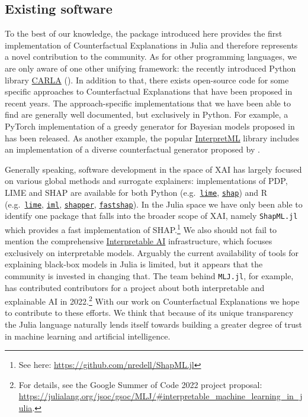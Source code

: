 \documentclass{juliacon}
\begin{document}
\hypertarget{existing-software}{%
\subsection{Existing software}\label{existing-software}}

To the best of our knowledge, the package introduced here provides the
first implementation of Counterfactual Explanations in Julia and
therefore represents a novel contribution to the community. As for other
programming languages, we are only aware of one other unifying
framework: the recently introduced Python library
\href{https://carla-counterfactual-and-recourse-library.readthedocs.io/en/latest/?badge=latest}{CARLA}
(\cite{pawelczyk2021carla}). In addition to that, there exists
open-source code for some specific approaches to Counterfactual
Explanations that have been proposed in recent years. The
approach-specific implementations that we have been able to find are
generally well documented, but exclusively in Python. For example, a
PyTorch implementation of a greedy generator for Bayesian models
proposed in \cite{schut2021generating} has been released. As another
example, the popular \href{https://github.com/interpretml}{InterpretML}
library includes an implementation of a diverse counterfactual generator
proposed by \cite{mothilal2020explaining}.

Generally speaking, software development in the space of XAI has largely
focused on various global methods and surrogate explainers:
implementations of PDP, LIME and SHAP are available for both Python
(e.g.~\href{https://github.com/marcotcr/lime}{\texttt{lime}},
\href{https://github.com/slundberg/shap}{\texttt{shap}}) and R
(e.g.~\href{https://cran.r-project.org/web/packages/lime/index.html}{\texttt{lime}},
\href{https://cran.r-project.org/web/packages/lime/index.html}{\texttt{iml}},
\href{https://modeloriented.github.io/shapper/}{\texttt{shapper}},
\href{https://github.com/bgreenwell/fastshap}{\texttt{fastshap}}). In
the Julia space we have only been able to identify one package that
falls into the broader scope of XAI, namely \texttt{ShapML.jl} which
provides a fast implementation of SHAP.\footnote{See here:
  \url{https://github.com/nredell/ShapML.jl}} We also should not fail to
mention the comprehensive
\href{https://docs.interpretable.ai/stable/IAIBase/data/}{Interpretable
AI} infrastructure, which focuses exclusively on interpretable models.
Arguably the current availability of tools for explaining black-box
models in Julia is limited, but it appears that the community is
invested in changing that. The team behind \texttt{MLJ.jl}, for example,
has contributed contributors for a project about both interpretable and
explainable AI in 2022.\footnote{For details, see the Google Summer of
  Code 2022 project proposal:
  \url{https://julialang.org/jsoc/gsoc/MLJ/\#interpretable_machine_learning_in_julia}.}
With our work on Counterfactual Explanations we hope to contribute to
these efforts. We think that because of its unique transparency the
Julia language naturally lends itself towards building a greater degree
of trust in machine learning and artificial intelligence.
\end{document}
